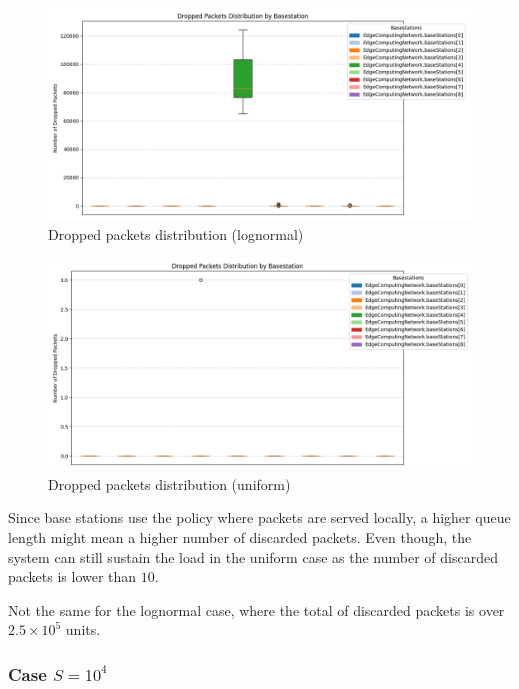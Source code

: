 \documentclass{report}
\begin{document}
\begin{figure}[H]
    \centering
    \includegraphics[width=\textwidth]{img/plots/log_1e3_A/dropped.png}
    \caption{Dropped packets distribution (lognormal)}
\end{figure}

\begin{figure}[H]
    \centering
    \includegraphics[width=\textwidth]{img/plots/uni_1e3_A/dropped.png}
    \caption{Dropped packets distribution (uniform)}
\end{figure}

Since base stations use the policy where packets are served locally, a higher queue length might mean a higher number of discarded packets. Even though, the system can still sustain the load in the uniform case as the number of discarded packets is lower than $10$.

Not the same for the lognormal case, where the total of discarded packets is over $2.5\times10^5$ units.

\vspace{10mm}

\subsubsection*{Case $S=10^4$}
\end{document}
